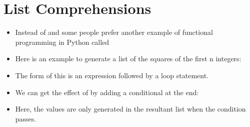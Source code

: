 \documentclass[letterpaper,10pt,english]{sphinxmanual}
\begin{document}
\section{List Comprehensions}
\label{\detokenize{lecture_notes/lec24_functional:list-comprehensions}}\begin{itemize}
\item {} 
Instead of  and  some people prefer another example
of functional programming in Python called 

\item {} 
Here is an example to generate a list of the squares of the first n integers:

%
\begin{sphinxVerbatim}[commandchars=\\\{\}]
  
\PYG{p}{[}      \PYG{p}{]}
\end{sphinxVerbatim}

\item {} 
The form of this is an expression followed by a  loop
statement.

\item {} 
We can get the effect of  by adding a conditional at the
end:

%
\begin{sphinxVerbatim}[commandchars=\\\{\}]
  \PYG{p}{[}       \PYG{p}{]}
\PYG{p}{[}        \PYG{p}{]}
\end{sphinxVerbatim}

\item {} 
Here, the values are only generated in the resultant list when the
 condition passes.


\end{itemize}
\end{document}
